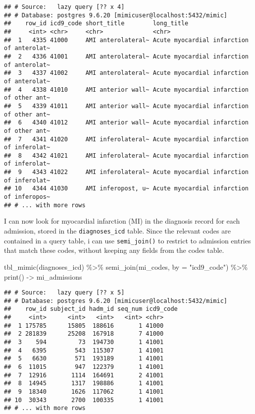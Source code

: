 \documentclass[
]{article}
\newenvironment{Shaded}{\begin{snugshade}}{\end{snugshade}}
\newcommand{\AttributeTok}[1]{\textcolor[rgb]{0.77,0.63,0.00}{#1}}
\newcommand{\FunctionTok}[1]{\textcolor[rgb]{0.00,0.00,0.00}{#1}}
\newcommand{\NormalTok}[1]{#1}
\newcommand{\OtherTok}[1]{\textcolor[rgb]{0.56,0.35,0.01}{#1}}
\newcommand{\SpecialCharTok}[1]{\textcolor[rgb]{0.00,0.00,0.00}{#1}}
\newcommand{\StringTok}[1]{\textcolor[rgb]{0.31,0.60,0.02}{#1}}
\begin{document}
\begin{verbatim}
## # Source:   lazy query [?? x 4]
## # Database: postgres 9.6.20 [mimicuser@localhost:5432/mimic]
##    row_id icd9_code short_title        long_title                               
##     <int> <chr>     <chr>              <chr>                                    
##  1   4335 41000     AMI anterolateral~ Acute myocardial infarction of anterolat~
##  2   4336 41001     AMI anterolateral~ Acute myocardial infarction of anterolat~
##  3   4337 41002     AMI anterolateral~ Acute myocardial infarction of anterolat~
##  4   4338 41010     AMI anterior wall~ Acute myocardial infarction of other ant~
##  5   4339 41011     AMI anterior wall~ Acute myocardial infarction of other ant~
##  6   4340 41012     AMI anterior wall~ Acute myocardial infarction of other ant~
##  7   4341 41020     AMI inferolateral~ Acute myocardial infarction of inferolat~
##  8   4342 41021     AMI inferolateral~ Acute myocardial infarction of inferolat~
##  9   4343 41022     AMI inferolateral~ Acute myocardial infarction of inferolat~
## 10   4344 41030     AMI inferopost, u~ Acute myocardial infarction of inferopos~
## # ... with more rows
\end{verbatim}

I can now look for myocardial infarction (MI) in the diagnosis record
for each admission, stored in the \texttt{diagnoses\_icd} table. Since
the relevant codes are contained in a query table, i can use
\texttt{semi\_join()} to restrict to admission entries that match these
codes, without keeping any fields from the codes table.

\begin{Shaded}
\begin{Highlighting}[]
\FunctionTok{tbl\_mimic}\NormalTok{(diagnoses\_icd) }\SpecialCharTok{\%\textgreater{}\%}
  \FunctionTok{semi\_join}\NormalTok{(mi\_codes, }\AttributeTok{by =} \StringTok{"icd9\_code"}\NormalTok{) }\SpecialCharTok{\%\textgreater{}\%}
  \FunctionTok{print}\NormalTok{() }\OtherTok{{-}\textgreater{}}\NormalTok{ mi\_admissions}
\end{Highlighting}
\end{Shaded}

\begin{verbatim}
## # Source:   lazy query [?? x 5]
## # Database: postgres 9.6.20 [mimicuser@localhost:5432/mimic]
##    row_id subject_id hadm_id seq_num icd9_code
##     <int>      <int>   <int>   <int> <chr>    
##  1 175785      15805  188616       1 41000    
##  2 281839      25208  167918       7 41000    
##  3    594         73  194730       1 41001    
##  4   6395        543  115307       1 41001    
##  5   6630        571  193189       1 41001    
##  6  11015        947  122379       1 41001    
##  7  12916       1114  164691       2 41001    
##  8  14945       1317  198886       1 41001    
##  9  18340       1626  117062       1 41001    
## 10  30343       2700  100335       1 41001    
## # ... with more rows
\end{verbatim}
\end{document}
